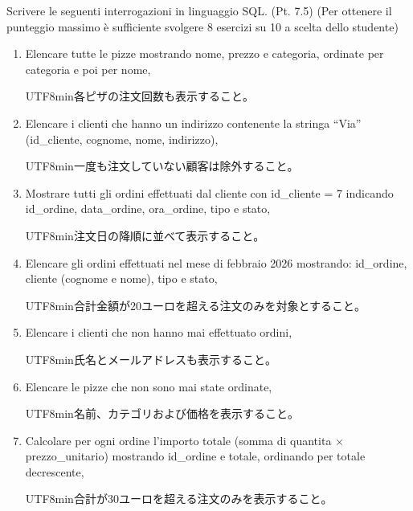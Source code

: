 \documentclass[a4paper,12pt]{article}
\begin{document}
	Scrivere le seguenti interrogazioni in linguaggio SQL.  (Pt. 7.5)
	(Per ottenere il punteggio massimo è sufficiente svolgere 8 esercizi su 10 a scelta dello studente)
	\begin{enumerate}
		\item Elencare tutte le pizze mostrando nome, prezzo e categoria, ordinate per categoria e poi per nome,
		\begin{CJK}{UTF8}{min}各ピザの注文回数も表示すること。\end{CJK}
		
		\item Elencare i clienti che hanno un indirizzo contenente la stringa ``Via'' (id\_cliente, cognome, nome, indirizzo),
		\begin{CJK}{UTF8}{min}一度も注文していない顧客は除外すること。\end{CJK}
		
		\item Mostrare tutti gli ordini effettuati dal cliente con id\_cliente = 7 indicando id\_ordine, data\_ordine, ora\_ordine, tipo e stato,
		\begin{CJK}{UTF8}{min}注文日の降順に並べて表示すること。\end{CJK}
		
		\item Elencare gli ordini effettuati nel mese di febbraio 2026 mostrando: id\_ordine, cliente (cognome e nome), tipo e stato,
		\begin{CJK}{UTF8}{min}合計金額が20ユーロを超える注文のみを対象とすること。\end{CJK}
		
		\item Elencare i clienti che non hanno mai effettuato ordini,
		\begin{CJK}{UTF8}{min}氏名とメールアドレスも表示すること。\end{CJK}
		
		\item Elencare le pizze che non sono mai state ordinate,
		\begin{CJK}{UTF8}{min}名前、カテゴリおよび価格を表示すること。\end{CJK}
		
		\item Calcolare per ogni ordine l'importo totale (somma di quantita $\times$ prezzo\_unitario) mostrando id\_ordine e totale, ordinando per totale decrescente,
		\begin{CJK}{UTF8}{min}合計が30ユーロを超える注文のみを表示すること。\end{CJK}
		

\end{enumerate}
\end{document}
